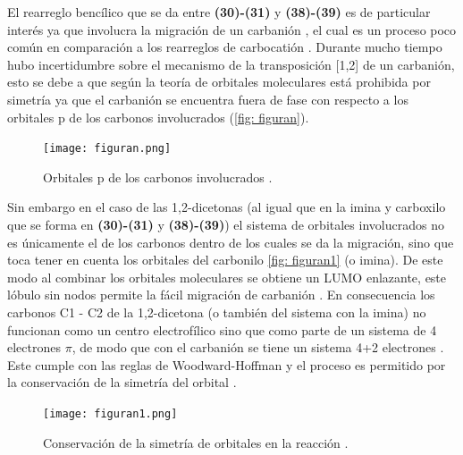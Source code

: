 \documentclass[fleqn,10pt]{SelfArx}
\begin{document}
El rearreglo bencílico que se da entre \textbf{(30)-(31)} y \textbf{(38)-(39)} es de particular interés ya que involucra la migración de un carbanión , el cual es un proceso poco común en comparación a los rearreglos de carbocatión \cite{comisar2007}. Durante mucho tiempo hubo incertidumbre sobre el mecanismo de la transposición [1,2] de un carbanión, esto se debe a que según la teoría de orbitales moleculares está prohibida por simetría ya que el carbanión se encuentra fuera de fase con respecto a los orbitales p de los carbonos involucrados \cite{yamabe2006}\cite{burke2007} (\autoref{fig: figuran}).
\begin{figure}[h]
	\centering
	\texttt{[image: figuran.png]}
	\caption{Orbitales p de los carbonos involucrados \cite{yamabe2006}.}
	\label{fig: figuran}
\end{figure}

Sin embargo en el caso de las 1,2-dicetonas (al igual que en la imina y carboxilo que se forma en \textbf{(30)-(31)} y \textbf{(38)-(39)})  el sistema de orbitales involucrados no es únicamente el de los carbonos dentro de los cuales se da la migración, sino que toca tener en cuenta los orbitales del carbonilo \autoref{fig: figuran1} (o imina). De este modo al combinar los orbitales moleculares se obtiene un LUMO enlazante, este lóbulo sin nodos permite la fácil migración de carbanión \cite{yamabe2006}. En consecuencia los carbonos C1 - C2 de la 1,2-dicetona (o también del sistema con la imina) no funcionan como un centro electrofílico sino que como parte de un sistema de 4 electrones $\pi$, de modo que con el carbanión se tiene un sistema 4+2 electrones \cite{yamabe2006}\cite{burke2007}. Este cumple con las reglas de Woodward-Hoffman y el proceso es permitido por la conservación de la simetría del orbital \cite{yamabe2006}.
\begin{figure}[h]
	\centering
	\texttt{[image: figuran1.png]}
	\caption{Conservaci\'on de la simetr\'ia de orbitales en la reacci\'on \cite{yamabe2006}.}
	\label{fig: figuran1}
\end{figure}
\end{document}
